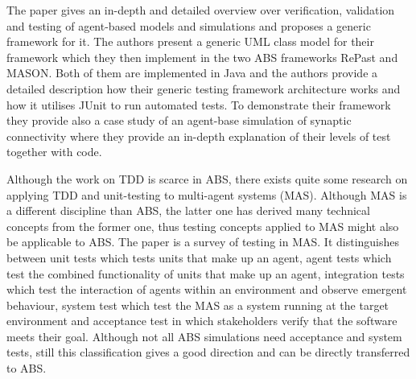 The paper \cite{gurcan_generic_2013} gives an in-depth and detailed overview over verification, validation and testing of agent-based models and simulations and proposes a generic framework for it. The authors present a generic UML class model for their framework which they then implement in the two ABS frameworks RePast and MASON. Both of them are implemented in Java and the authors provide a detailed description how their generic testing framework architecture works and how it utilises JUnit to run automated tests. To demonstrate their framework they provide also a case study of an agent-base simulation of synaptic connectivity where they provide an in-depth explanation of their levels of test together with code.


Although the work on TDD is scarce in ABS, there exists quite some research on applying TDD and unit-testing to multi-agent systems (MAS). Although MAS is a different discipline than ABS, the latter one has derived many technical concepts from the former one, thus testing concepts applied to MAS might also be applicable to ABS. The paper \cite{nguyen_testing_2011} is a survey of testing in MAS. It distinguishes between unit tests which tests units that make up an agent, agent tests which test the combined functionality of units that make up an agent, integration tests which test the interaction of agents within an environment and observe emergent behaviour, system test which test the MAS as a system running at the target environment and acceptance test in which stakeholders verify that the software meets their goal. Although not all ABS simulations need acceptance and system tests, still this classification gives a good direction and can be directly transferred to ABS.  %




